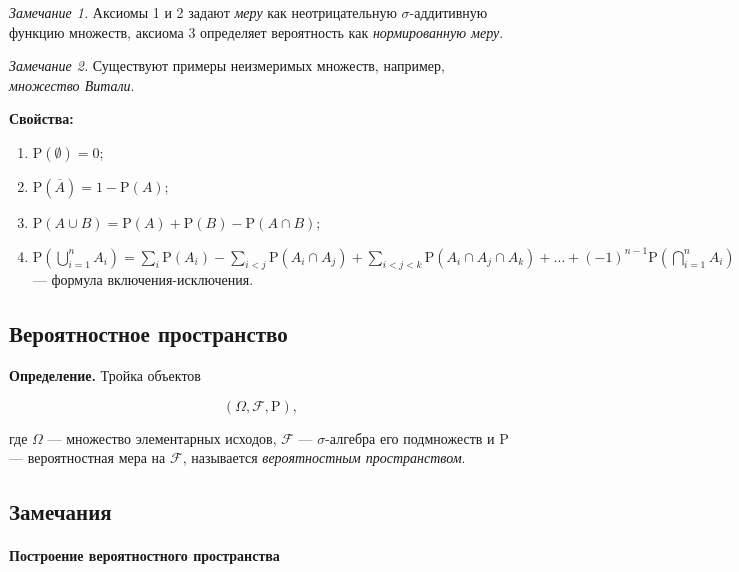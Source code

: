 \documentclass[11pt,a4paper]{article}
\providecommand{\tightlist}{%
      \setlength{\itemsep}{0pt}\setlength{\parskip}{0pt}}
\begin{document}
\emph{Замечание 1.} Аксиомы 1 и 2 задают \emph{меру} как неотрицательную
\(\sigma\)-аддитивную функцию множеств, аксиома 3 определяет вероятность
как \emph{нормированную меру}.

\emph{Замечание 2.} Существуют примеры неизмеримых множеств, например,
\emph{множество Витали}.

    \textbf{Свойства:}

\begin{enumerate}
\def\labelenumi{\arabic{enumi}.}
\tightlist
\item
  \(\mathrm{P}(\emptyset) = 0\);
\item
  \(\mathrm{P}(\overline{A}) = 1 - \mathrm{P}(A)\);
\item
  \(\mathrm{P}(A \cup B) = \mathrm{P}(A) + \mathrm{P}(B) - \mathrm{P}(A \cap B)\);
\item
  \(\mathrm{P}\left( \bigcup\limits_{i=1}^{n}A_i \right) = \sum\limits_{i}\mathrm{P}(A_i) - \sum\limits_{i<j}\mathrm{P}(A_i \cap A_j) + \sum\limits_{i<j<k}\mathrm{P}(A_i \cap A_j \cap A_k) + \ldots + (-1)^{n-1} \mathrm{P}\left( \bigcap\limits_{i=1}^{n}A_i \right)\)
  --- формула включения-исключения.
\end{enumerate}

    \hypertarget{ux432ux435ux440ux43eux44fux442ux43dux43eux441ux442ux43dux43eux435-ux43fux440ux43eux441ux442ux440ux430ux43dux441ux442ux432ux43e}{%
\subsection{Вероятностное
пространство}\label{ux432ux435ux440ux43eux44fux442ux43dux43eux441ux442ux43dux43eux435-ux43fux440ux43eux441ux442ux440ux430ux43dux441ux442ux432ux43e}}

\textbf{Определение.} Тройка объектов

\[ \left( \Omega, \mathcal{F}, \mathrm{P} \right), \]

где \(\Omega\) --- множество элементарных исходов, \(\mathcal{F}\) ---
\(\sigma\)-алгебра его подмножеств и \(\mathrm{P}\) --- вероятностная
мера на \(\mathcal{F}\), называется \emph{вероятностным пространством}.

    \hypertarget{ux437ux430ux43cux435ux447ux430ux43dux438ux44f}{%
\subsection{Замечания}\label{ux437ux430ux43cux435ux447ux430ux43dux438ux44f}}

\hypertarget{ux43fux43eux441ux442ux440ux43eux435ux43dux438ux435-ux432ux435ux440ux43eux44fux442ux43dux43eux441ux442ux43dux43eux433ux43e-ux43fux440ux43eux441ux442ux440ux430ux43dux441ux442ux432ux430}{%
\paragraph{Построение вероятностного
пространства}\label{ux43fux43eux441ux442ux440ux43eux435ux43dux438ux435-ux432ux435ux440ux43eux44fux442ux43dux43eux441ux442ux43dux43eux433ux43e-ux43fux440ux43eux441ux442ux440ux430ux43dux441ux442ux432ux430}}
\end{document}
